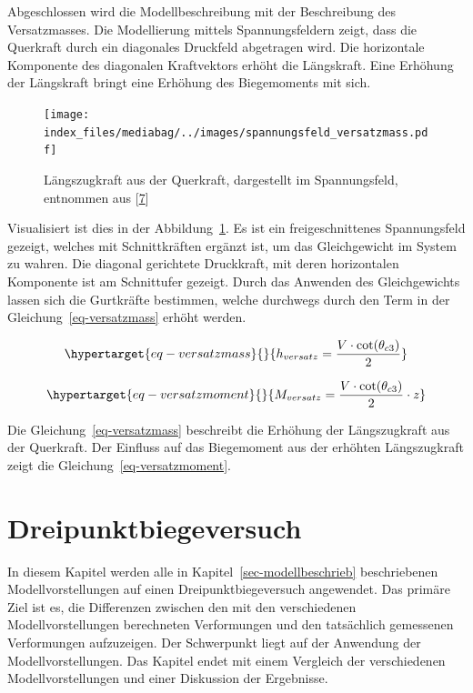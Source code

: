 \documentclass[
  12pt,
  letterpaper,
  egregdoesnotlikesansseriftitles]{scrreprt}
\begin{document}
Abgeschlossen wird die Modellbeschreibung mit der Beschreibung des
Versatzmasses. Die Modellierung mittels Spannungsfeldern zeigt, dass die
Querkraft durch ein diagonales Druckfeld abgetragen wird. Die
horizontale Komponente des diagonalen Kraftvektors erhöht die
Längskraft. Eine Erhöhung der Längskraft bringt eine Erhöhung des
Biegemoments mit sich.

\begin{figure}[H]

{\centering \texttt{[image: index\_files/mediabag/../images/spannungsfeld\_versatzmass.pdf]}

}

\caption{\label{fig-laengszug_spf}Längszugkraft aus der Querkraft,
dargestellt im Spannungsfeld, entnommen aus
{[}\protect\hyperlink{ref-Thoma2020}{7}{]}}

\end{figure}

Visualisiert ist dies in der Abbildung~\ref{fig-laengszug_spf}. Es ist
ein freigeschnittenes Spannungsfeld gezeigt, welches mit Schnittkräften
ergänzt ist, um das Gleichgewicht im System zu wahren. Die diagonal
gerichtete Druckkraft, mit deren horizontalen Komponente ist am
Schnittufer gezeigt. Durch das Anwenden des Gleichgewichts lassen sich
die Gurtkräfte bestimmen, welche durchwegs durch den Term in der
Gleichung~\ref{eq-versatzmass} erhöht werden.

\begin{equation}\protect\hypertarget{eq-versatzmass}{}{
h_{versatz} = \frac{V \cdot \cot(\theta_{c3})}{2}
}\label{eq-versatzmass}\end{equation}

\begin{equation}\protect\hypertarget{eq-versatzmoment}{}{
M_{versatz} = \frac{V \cdot \cot(\theta_{c3})}{2} \cdot z
}\label{eq-versatzmoment}\end{equation}

Die Gleichung~\ref{eq-versatzmass} beschreibt die Erhöhung der
Längszugkraft aus der Querkraft. Der Einfluss auf das Biegemoment aus
der erhöhten Längszugkraft zeigt die Gleichung~\ref{eq-versatzmoment}.


\hypertarget{sec-dreipunkt}{%
\chapter{Dreipunktbiegeversuch}\label{sec-dreipunkt}}

In diesem Kapitel werden alle in Kapitel~\ref{sec-modellbeschrieb}
beschriebenen Modellvorstellungen auf einen Dreipunktbiegeversuch
angewendet. Das primäre Ziel ist es, die Differenzen zwischen den mit
den verschiedenen Modellvorstellungen berechneten Verformungen und den
tatsächlich gemessenen Verformungen aufzuzeigen. Der Schwerpunkt liegt
auf der Anwendung der Modellvorstellungen. Das Kapitel endet mit einem
Vergleich der verschiedenen Modellvorstellungen und einer Diskussion der
Ergebnisse.
\end{document}
